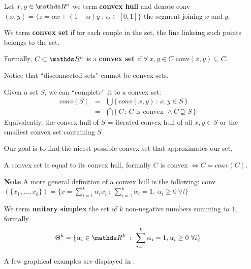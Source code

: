 \documentclass[computationalMathematics.tex]{subfiles}
\begin{document}
\begin{definition}
  Let $x, y \in \R^n$ we term \textbf{convex hull} and denote conv$(x, y) = \{z = \alpha x + ( 1 - \alpha ) y~:~ \alpha \in [0, 1]\}$ the segment joining $x$ and $y$.
\end{definition}

\begin{definition}
  We term \textbf{convex set} if for each couple in the set, the line linksing such points belongs to the set.

  Formally, $C \subset \R^n$ is a \textbf{convex set} if $\forall~x, y \in C$ conv$(x,y) \subseteq C$.
\end{definition}

Notice that ``disconnected sets'' cannot be convex sets.

\begin{definition}
Given a set $S$, we can ``complete'' it to a convex set:
\[
\begin{array}{rcl}
 conv(S) & = &
 \bigcup \{ \, conv(x,y) \,:\, x, y \in S \, \} \\[0.2cm]
 & = &
 \bigcap \{ \, C \,:\, C \mbox{ is convex } \wedge
                         C \supseteq S \, \}
\end{array}
\]
Equivalently, the convex hull of $S$ = iterated convex hull of all $x, y \in S$ or the smallest convex set containing $S$
\end{definition}

Our goal is to find the nicest possible convex set that approximates our set.

\begin{proposition}
A convex set is equal to its convex hull, formally $C$ is convex $\iff C = conv(C)$.
\end{proposition}

\begin{myframe}{\bf Note}
A more general definition of a convex hull is the following:
conv$(\{x_1, \ldots, x_k\}) = \{x = \sum_{i=1}^k \alpha_i x_i~:~\sum_{i=1}^k \alpha_i = 1,~\alpha_i \geq 0~\forall i\}$ 
\end{myframe}

\begin{definition}
  We term \textbf{unitary simplex} the set of $k$ non-negative numbers summing to $1$, formally
\[
\Theta^k = \{\alpha_i \in \R^k~:~\sum_{i=1}^k \alpha_i = 1, \alpha_i \geq 0~\forall i\}
\]

  A few graphical examples are displayed in .
\end{definition}
\end{document}
